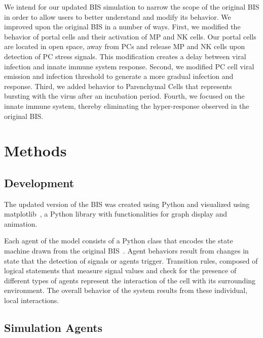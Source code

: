 \documentclass[10pt,conference]{IEEEtran}
\begin{document}
\indent
We intend for our updated BIS simulation to narrow the scope of the original
BIS in order to allow users to better understand and modify its behavior. We
improved upon the original BIS in a number of ways. First, we modified the
behavior of portal cells and their activation of MP and NK cells. Our portal
cells are located in open space, away from PCs and release MP and NK cells upon
detection of PC stress signals.  This modification creates a delay between
viral infection and innate immune system response. Second, we modified PC cell
viral emission and infection threshold to generate a more gradual infection and
response. Third, we added behavior to Parenchymal Cells that represents
bursting with the virus after an incubation period. Fourth, we focused on the
innate immune system, thereby eliminating the hyper-response observed in the
original BIS.

\vspace{.5in}
\section{Methods}
\subsection{Development}
The updated version of the BIS was created using Python and visualized using
matplotlib~\cite{Hunter:2007}, a Python library with functionalities for graph
display and animation.

\indent
Each agent of the model consists of a Python class that encodes the state
machine drawn from the original BIS~\cite{Folcik:2007}. Agent behaviors result
from changes in state that the detection of signals or agents trigger.
Transition rules, composed of logical statements that measure signal values and
check for the presence of different types of agents represent the interaction
of the cell with its surrounding environment. The overall behavior of the
system results from these individual, local interactions.

\subsection{Simulation Agents}
\end{document}
